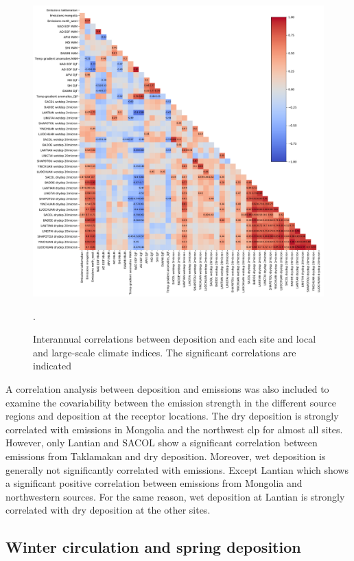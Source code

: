 \begin{figure}[htpb]
    \centering
    \includegraphics[width=\textwidth]{texfiles/figs/correlations.pdf}
    \caption{Interannual correlations between deposition and each site and local and large-scale climate indices. The significant correlations are indicated}.
    \label{fig:correlations}
\end{figure}

A correlation analysis between deposition and emissions was also included to examine the covariability between the emission strength in the different source regions and deposition at the receptor locations. 
The dry deposition is strongly correlated with emissions in Mongolia and the northwest \acrshort{clp} for almost all sites. However, only Lantian and SACOL show a significant correlation between emissions from Taklamakan and dry deposition. 
Moreover, wet deposition is generally not significantly correlated with emissions. 
Except Lantian which shows a significant positive correlation between emissions from Mongolia and northwestern sources. For the same reason, wet deposition at Lantian is strongly correlated with dry deposition at the other sites.  

\subsection{Winter circulation and spring deposition}

